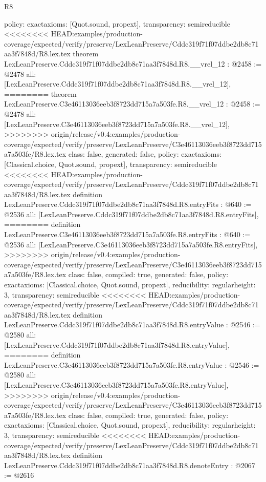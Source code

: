 \begin{lexlean}{R8}
\begin{coremodule}
{{{{{{{{{{{{{{{{{{{{{{{{{{{{{{{{{  policy: exact{axioms: [Quot.sound, propext]},
  transparency: semireducible
}
<<<<<<<< HEAD:examples/production-coverage/expected/verify/preserve/LexLeanPreserve/Cddc319f71f07ddbe2db8c71aa3f7848d/R8.lex.tex
theorem LexLeanPreserve.Cddc319f71f07ddbe2db8c71aa3f7848d.R8.__vrel_12 : @2458 := @2478 {
  all: [LexLeanPreserve.Cddc319f71f07ddbe2db8c71aa3f7848d.R8.__vrel_12],
========
theorem LexLeanPreserve.C3e46113036eeb3f8723dd715a7a503fe.R8.__vrel_12 : @2458 := @2478 {
  all: [LexLeanPreserve.C3e46113036eeb3f8723dd715a7a503fe.R8.__vrel_12],
>>>>>>>> origin/release/v0.4:examples/production-coverage/expected/verify/preserve/LexLeanPreserve/C3e46113036eeb3f8723dd715a7a503fe/R8.lex.tex
  class: false,
  generated: false,
  policy: exact{axioms: [Classical.choice, Quot.sound, propext]},
  transparency: semireducible
}
<<<<<<<< HEAD:examples/production-coverage/expected/verify/preserve/LexLeanPreserve/Cddc319f71f07ddbe2db8c71aa3f7848d/R8.lex.tex
definition LexLeanPreserve.Cddc319f71f07ddbe2db8c71aa3f7848d.R8.entryFits : @640 := @2536 {
  all: [LexLeanPreserve.Cddc319f71f07ddbe2db8c71aa3f7848d.R8.entryFits],
========
definition LexLeanPreserve.C3e46113036eeb3f8723dd715a7a503fe.R8.entryFits : @640 := @2536 {
  all: [LexLeanPreserve.C3e46113036eeb3f8723dd715a7a503fe.R8.entryFits],
>>>>>>>> origin/release/v0.4:examples/production-coverage/expected/verify/preserve/LexLeanPreserve/C3e46113036eeb3f8723dd715a7a503fe/R8.lex.tex
  class: false,
  compiled: true,
  generated: false,
  policy: exact{axioms: [Classical.choice, Quot.sound, propext]},
  reducibility: regular{height: 3},
  transparency: semireducible
}
<<<<<<<< HEAD:examples/production-coverage/expected/verify/preserve/LexLeanPreserve/Cddc319f71f07ddbe2db8c71aa3f7848d/R8.lex.tex
definition LexLeanPreserve.Cddc319f71f07ddbe2db8c71aa3f7848d.R8.entryValue : @2546 := @2580 {
  all: [LexLeanPreserve.Cddc319f71f07ddbe2db8c71aa3f7848d.R8.entryValue],
========
definition LexLeanPreserve.C3e46113036eeb3f8723dd715a7a503fe.R8.entryValue : @2546 := @2580 {
  all: [LexLeanPreserve.C3e46113036eeb3f8723dd715a7a503fe.R8.entryValue],
>>>>>>>> origin/release/v0.4:examples/production-coverage/expected/verify/preserve/LexLeanPreserve/C3e46113036eeb3f8723dd715a7a503fe/R8.lex.tex
  class: false,
  compiled: true,
  generated: false,
  policy: exact{axioms: [Classical.choice, Quot.sound, propext]},
  reducibility: regular{height: 3},
  transparency: semireducible
}
<<<<<<<< HEAD:examples/production-coverage/expected/verify/preserve/LexLeanPreserve/Cddc319f71f07ddbe2db8c71aa3f7848d/R8.lex.tex
definition LexLeanPreserve.Cddc319f71f07ddbe2db8c71aa3f7848d.R8.denoteEntry : @2067 := @2616 {
}}}}}}}}}}}}}}}}}}}}}}}}}}}}}}}}}}}}
\end{coremodule}
\end{lexlean}
